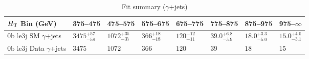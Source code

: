 \documentclass[8pt]{article}
\def\scalht{\mbox{$H_{\rm{T}}$}\xspace}
\newcommand\T{\rule{0pt}{2.6ex}}
\begin{document}
\begin{table}[ht!]
\caption{Fit summary ($\gamma$+jets)}
\label{tab:ensemble-summary}
\centering
\begin{tabular}{ llllllll }

\hline
\scalht Bin (GeV)       & 375--475                       & 475--575                       & 575--675                       & 675--775                       & 775--875                       & 875--975                       & 975--$\infty$                  \\ [1.000000ex]
\hline
0b le3j SM $\gamma$+jets\T & $3475^{+57}_{-58}$             & $1072^{+35}_{-37}$             & $366^{+18}_{-18}$              & $120^{+12}_{-11}$              & $39.0^{+6.8}_{-5.9}$           & $18.0^{+3.3}_{-5.0}$           & $15.0^{+4.0}_{-3.1}$           \\ 
0b le3j Data $\gamma$+jets\T & $3475$                         & $1072$                         & $366$                          & $120$                          & $39$                           & $18$                           & $15$                           \\ 
\hline

\end{tabular}
\end{table}
\end{document}
